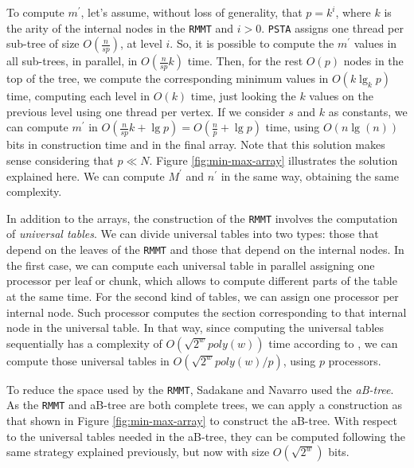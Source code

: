 To compute $m^{\prime}$, let's assume, without loss of generality,
that $p = k^{i}$, where $k$ is the arity
of the internal nodes in the {\tt RMMT} and $i > 0$. {\tt PSTA}
assigns one thread per sub-tree of size $O(\frac{n}{sp})$, at level
$i$. So, it is possible to compute the $m^{\prime}$ values in all
sub-trees, in parallel, in $O(\frac{n}{sp}k)$ time. Then, for the
rest $O(p)$ nodes in the top of the tree, we compute the corresponding
minimum values in $O(k\lg_{k} p)$ time, computing each level in $O(k)$
time, just looking the $k$ values on the previous level using one
thread per vertex. If we consider $s$ and $k$ as constants, we can compute
$m^{\prime}$ in
$O(\frac{n}{sp}k + \lg p) = O(\frac{n}{p}+\lg p)$ time,
using $O(n\lg(n))$ bits in construction time and in the
final array. Note that this solution makes sense considering that
$p\ll N$. Figure \ref{fig:min-max-array} illustrates the solution
explained here. We can compute $M^{\prime}$ and $n^{\prime}$ in the
same way, obtaining the same complexity.


In addition to the arrays, the construction of the {\tt RMMT} involves
the computation of \emph{universal tables}.
We can divide
universal tables into two types: those that depend on the leaves of
the {\tt RMMT} and those that depend on the internal nodes. In the
first case, we can compute each universal table in parallel assigning
one processor per leaf or chunk, which allows to compute different
parts of the table at the same time. For the second kind of tables, we
can assign one processor per internal node. Such processor computes
the section corresponding to that internal node in the universal
table. In that way, since computing the universal tables sequentially
has a complexity of $O(\sqrt{2^{w}}poly(w))$ time according to
\cite{Navarro:2014:FFS:2620785.2601073}, we can compute those
universal tables in $\displaystyle O(\sqrt{2^{w}}poly(w)/p)$,
using $p$ processors.

To reduce the space used by the {\tt RMMT}, Sadakane and Nava\-rro used
the \emph{aB-tree}. As the {\tt RMMT} and aB-tree are both complete trees, we can apply a
construction as that shown in Figure \ref{fig:min-max-array} to
construct the aB-tree. With respect to the universal tables needed in
the aB-tree, they can be computed following the same strategy
explained previously, but now with size $O(\sqrt{2^{w}})$
bits.

